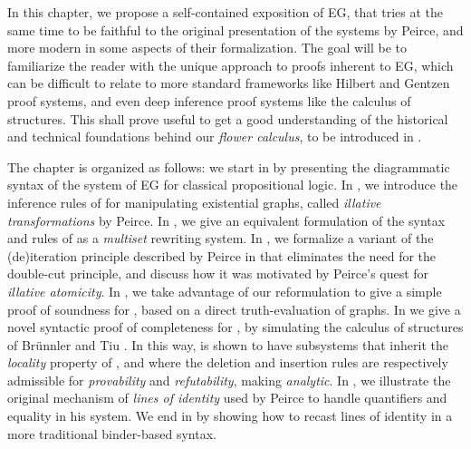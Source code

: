 In this chapter, we propose a self-contained exposition of EG, that tries at the
same time to be faithful to the original presentation of the systems by Peirce,
and more modern in some aspects of their formalization. The goal will be to
familiarize the reader with the unique approach to proofs inherent to EG, which
can be difficult to relate to more standard frameworks like Hilbert and Gentzen
proof systems, and even deep inference proof systems like the calculus of
structures. This shall prove useful to get a good understanding of the
historical and technical foundations behind our \emph{flower calculus}, to be
introduced in .

The chapter is organized as follows: we start in  by presenting
the diagrammatic syntax of the system  of EG for classical
propositional logic. In , we introduce the inference rules of
 for manipulating existential graphs, called \emph{illative
transformations} by Peirce. In , we give an equivalent
formulation of the syntax and rules of  as a \emph{multiset}
rewriting system. In , we formalize a variant of the
(de)iteration principle described by Peirce in
 that eliminates the need for the double-cut
principle, and discuss how it was motivated by Peirce's quest for \emph{illative
atomicity}. In , we take advantage of our reformulation to
give a simple proof of soundness for , based on a direct
truth-evaluation of graphs. In  we give a novel
syntactic proof of completeness for , by simulating the calculus of
structures  of Brünnler and Tiu \cite{brunnler_local_2001}. In this
way,  is shown to have subsystems that inherit the \emph{locality}
property of , and where the deletion and insertion rules are
respectively admissible for \emph{provability} and \emph{refutability}, making
 \emph{analytic}. In , we illustrate the original
mechanism of \emph{lines of identity} used by Peirce to handle quantifiers and
equality in his  system. We end in  by showing how to
recast lines of identity in a more traditional binder-based syntax.



